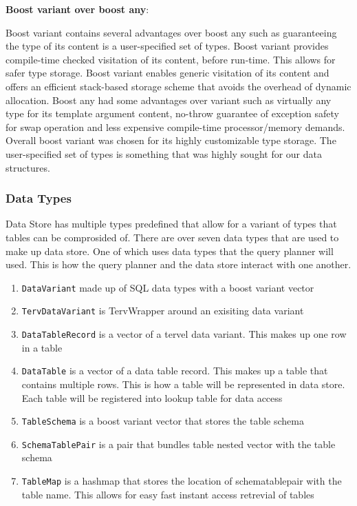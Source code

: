 \documentclass[letterpaper, 12pt]{article}
\newcommand{\inlinecode}[1]{\colorbox{codegrey}{\lstinline[language=C++]{#1}}}
\begin{document}
\par\vspace{\baselineskip}
{\bfseries Boost variant over boost any}:
\par\vspace{\baselineskip}
Boost variant contains several advantages over boost any such as guaranteeing the type of its
content is a user-specified set of types. Boost variant provides compile-time checked
visitation of its content, before run-time. This allows for safer type storage. Boost variant
enables generic visitation of its content and offers an efficient stack-based storage scheme
that avoids the overhead of dynamic allocation. Boost any had some advantages over variant such
as virtually any type for its template argument content, no-throw guarantee of exception safety
for swap operation and less expensive compile-time processor/memory demands. Overall boost
variant was chosen for its highly customizable type storage. The user-specified set of types
is something that was highly sought for our data structures.
\par\vspace{\baselineskip}

\newpage
\subsubsection{Data Types}
	Data Store has multiple types predefined that allow for a variant of types that tables can be
	comprosided of. There are over seven data types that are used to make up data store. One of which
	uses data types that the query planner will used. This is how the query planner and the data store
	interact with one another.
	
	\begin{enumerate}
		\item \inlinecode{DataVariant} made up of SQL data types with a boost variant vector
		\item \inlinecode{TervDataVariant} is TervWrapper around an exisiting data variant
		\item \inlinecode{DataTableRecord} is a vector of a tervel data variant. This makes up one row in
		a table
		\item \inlinecode{DataTable} is a vector of a data table record. This makes up a table that contains multiple rows.
		This is how a table will be represented in data store. Each table will be registered into lookup table
		for data access
		\item \inlinecode{TableSchema} is a boost variant vector that stores the table schema
		\item \inlinecode{SchemaTablePair} is a pair that bundles table nested vector with the table schema
		\item \inlinecode{TableMap} is a hashmap that stores the location of schematablepair with the table name. This
		allows for easy fast instant access retrevial of tables
	\end{enumerate}
\end{document}
